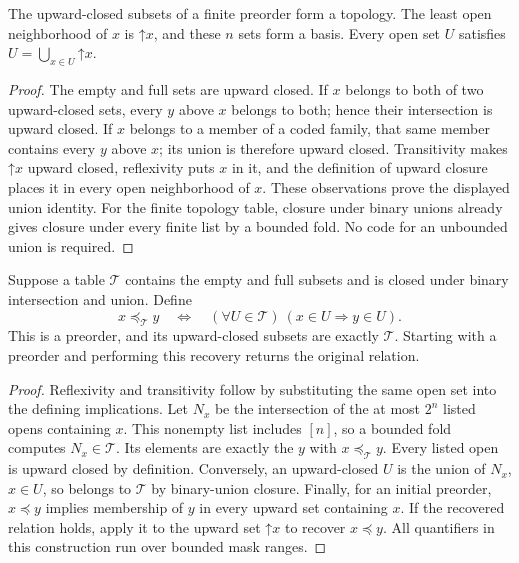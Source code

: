 \begin{theorem}\label{thm:finite-upsets}
The upward-closed subsets of a finite preorder form a topology.
The least open neighborhood of $x$ is $\mathord\uparrow x$, and these
$n$ sets form a basis.  Every open set $U$ satisfies
$U=\bigcup_{x\in U}\mathord\uparrow x$.
\end{theorem}
\begin{proof}
The empty and full sets are upward closed.  If $x$ belongs to both of
two upward-closed sets, every $y$ above $x$ belongs to both; hence their
intersection is upward closed.  If $x$ belongs to a member of a coded
family, that same member contains every $y$ above $x$; its union is
therefore upward closed.  Transitivity makes
$\mathord\uparrow x$ upward closed, reflexivity puts $x$ in it, and
the definition of upward closure places it in every open neighborhood
of $x$.  These observations prove the displayed union identity.
For the finite topology table, closure under binary unions already
gives closure under every finite list by a bounded fold.  No code for
an unbounded union is required.
\end{proof}

\begin{theorem}\label{thm:finite-recover}
Suppose a table $\mathcal T$ contains the empty and full subsets and
is closed under binary intersection and union.  Define
\[
 x\preceq_{\mathcal T}y
 \quad\Longleftrightarrow\quad
 (\forall U\in\mathcal T)\ (x\in U\Rightarrow y\in U).
\]
This is a preorder, and its upward-closed subsets are exactly
$\mathcal T$.  Starting with a preorder and performing this recovery
returns the original relation.
\end{theorem}
\begin{proof}
Reflexivity and transitivity follow by substituting the same open set
into the defining implications.  Let $N_x$ be the intersection of
the at most $2^n$ listed opens containing $x$.  This nonempty list
includes $[n]$, so a bounded fold computes $N_x\in\mathcal T$.
Its elements are exactly the $y$ with $x\preceq_{\mathcal T}y$.
Every listed open is upward closed by definition.  Conversely, an
upward-closed $U$ is the union of $N_x$, $x\in U$, so belongs to
$\mathcal T$ by binary-union closure.  Finally, for an initial
preorder, $x\preceq y$ implies membership of $y$ in every upward
set containing $x$.  If the recovered relation holds, apply it to
the upward set $\mathord\uparrow x$ to recover $x\preceq y$.
All quantifiers in this construction run over bounded mask ranges.
\end{proof}

